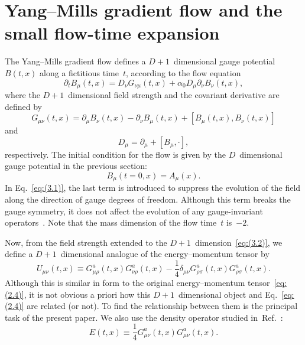 \section{Yang--Mills gradient flow and the small flow-time expansion}
\label{sec:3}
The Yang--Mills gradient flow defines a $D+1$~dimensional gauge
potential~$B(t,x)$ along a fictitious time~$t$, according to the flow equation
\begin{equation}
   \partial_tB_\mu(t,x)=D_\nu G_{\nu\mu}(t,x)
   +\alpha_0D_\mu\partial_\nu B_\nu(t,x),
\label{eq:(3.1)}
\end{equation}
where the $D+1$~dimensional field strength and the covariant derivative are
defined by
\begin{equation}
   G_{\mu\nu}(t,x)
   =\partial_\mu B_\nu(t,x)-\partial_\nu B_\mu(t,x)
   +[B_\mu(t,x),B_\nu(t,x)]
\label{eq:(3.2)}
\end{equation}
and
\begin{equation}
   D_\mu=\partial_\mu+[B_\mu,\cdot],
\label{eq:(3.3)}
\end{equation}
respectively. The initial condition for the flow is given by the
$D$~dimensional gauge potential in the previous section:
\begin{equation}
   B_\mu(t=0,x)=A_\mu(x).
\label{eq:(3.4)}
\end{equation}
In Eq.~\eqref{eq:(3.1)}, the last term is introduced to suppress the evolution
of the field along the direction of gauge degrees of freedom. Although this
term breaks the gauge symmetry, it does not affect the evolution of any
gauge-invariant operators~\cite{Luscher:2010iy}. Note that the mass dimension
of the flow time~$t$ is~$-2$.

Now, from the field strength extended to the $D+1$~dimension~\eqref{eq:(3.2)},
we define a $D+1$~dimensional analogue of the energy--momentum tensor by
\begin{equation}
   U_{\mu\nu}(t,x)\equiv
   G_{\mu\rho}^a(t,x)G_{\nu\rho}^a(t,x)
   -\frac{1}{4}\delta_{\mu\nu}G_{\rho\sigma}^a(t,x)G_{\rho\sigma}^a(t,x).
\label{eq:(3.5)}
\end{equation}
Although this is similar in form to the original energy--momentum
tensor~\eqref{eq:(2.4)}, it is not obvious a priori how this $D+1$~dimensional
object and Eq.~\eqref{eq:(2.4)} are related (or not). To find the relationship
between them is the principal task of the present paper. We also use the
density operator studied in~Ref.~\cite{Luscher:2010iy}:
\begin{equation}
   E(t,x)\equiv\frac{1}{4}G_{\mu\nu}^a(t,x)G_{\mu\nu}^a(t,x).
\label{eq:(3.6)}
\end{equation}

